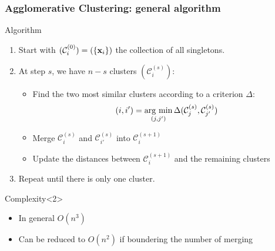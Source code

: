 \documentclass{beamer}\usepackage[]{graphicx}\usepackage[]{color}
\begin{document}
\begin{frame}
  \frametitle{Agglomerative Clustering: general algorithm}

  \begin{block}{Algorithm}
    \vspace{-.25cm}
    \begin{enumerate}
      \item Start with $(\mathcal{C}_i^{(0)})= (\{ \mathbf{x}_i \})$ the collection of all singletons.
      \item At step $s$, we have $n-s$ clusters $(\mathcal{C}_{i}^{(s)})$:

      \begin{itemize}
        \item Find the two most similar clusters according to a criterion $\Delta$:%
        \begin{align*}
          (i,i') = \mathop{\mathrm{arg\ min}}_{(j,j')} \Delta(\mathcal{C}_{j}^{(s)},\mathcal{C}_{j'}^{(s)})
        \end{align*}
        \item Merge $\mathcal{C}_{i}^{(s)}$ and $\mathcal{C}_{i'}^{(s)}$ into $\mathcal{C}_{i}^{(s+1)}$
        \item Update the distances between $\mathcal{C}_{i}^{(s+1)}$ and the remaining clusters
      \end{itemize}
  
      \item Repeat until there is only one cluster.
    \end{enumerate}
  \end{block}

  \vfill

  \begin{block}{Complexity}<2>
    \vspace{-.25cm}
    \begin{itemize}
      \item In general $O(n^3)$
      \item Can be reduced to $O(n^2)$ if boundering the number of merging
    \end{itemize}
  \end{block}
  
\end{frame}
\end{document}
